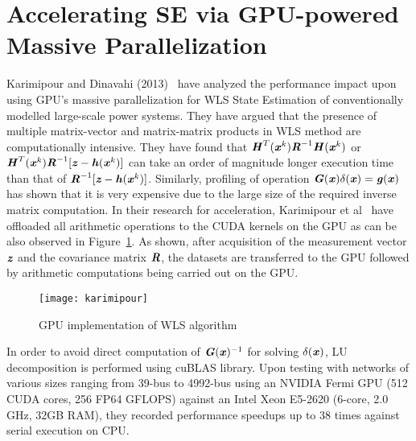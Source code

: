 \documentclass[thesis.tex]{subfiles}
\begin{document}
\section{Accelerating SE via GPU-powered Massive Parallelization}\label{apsse}
Karimipour and Dinavahi (2013)~\cite{KarimipourAcc} have analyzed the performance impact upon using GPU’s massive parallelization for WLS State Estimation of conventionally modelled large-scale power systems. They have argued that the presence of multiple matrix-vector and matrix-matrix products in WLS method are computationally intensive. They have found that $\textbf{\textit{H}}^{T}(\textbf{\textit{x}}^{k})\textbf{\textit{R}}^{-1}\textbf{\textit{H}}(\textbf{\textit{x}}^{k})$ or $\textbf{\textit{H}}^{T}(\textbf{\textit{x}}^{k})\textbf{\textit{R}}^{-1}[\textbf{\textit{z}}-\textbf{\textit{h}}(\textbf{\textit{x}}^{k})]$ can take an order of magnitude longer execution time than that of $\textbf{\textit{R}}^{-1}[\textbf{\textit{z}}-\textbf{\textit{h}}(\textbf{\textit{x}}^{k})]$. Similarly, profiling of operation $\textbf{\textit{G}}(\textbf{\textit{x}})\delta(\textbf{\textit{x}}) = \textbf{\textit{g}}(\textbf{\textit{x}})$ has shown that it is very expensive due to the large size of the required inverse matrix computation. In their research for acceleration, Karimipour et al~\cite{KarimipourAcc} have offloaded all arithmetic operations to the CUDA kernels on the GPU as can be also observed in Figure~\ref{fig:karimipour}. As shown, after acquisition of the measurement vector $\textbf{\textit{z}}$ and the covariance matrix $\textbf{\textit{R}}$, the datasets are transferred to the GPU followed by arithmetic computations being carried out on the GPU.
\begin{figure}[H]
	\centering
	\texttt{[image: karimipour]}
	\caption{GPU implementation of WLS algorithm~\cite{KarimipourAcc}}
	\label{fig:karimipour}
\end{figure}
In order to avoid direct computation of $\textbf{\textit{G}}(\textbf{\textit{x}})^{-1}$ for solving $\delta(\textbf{\textit{x}})$, LU decomposition is performed using cuBLAS library. Upon testing with networks of various sizes ranging from 39-bus to 4992-bus using an NVIDIA Fermi GPU (512 CUDA cores, 256 FP64 GFLOPS) against an Intel Xeon E5-2620 (6-core, 2.0 GHz, 32GB RAM), they recorded performance speedups up to 38 times against serial execution on CPU.
\end{document}
